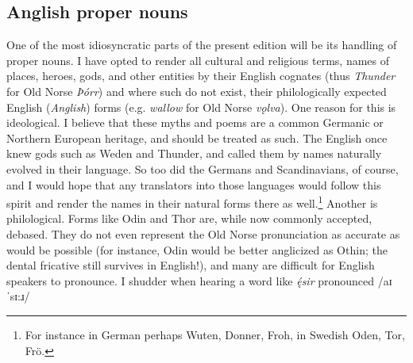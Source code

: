     \subsection{Anglish proper nouns}
      One of the most idiosyncratic parts of the present edition will be its handling of proper nouns. I have opted to render all cultural and religious terms, names of places, heroes, gods, and other entities by their English cognates (thus \emph{Thunder} for Old Norse \emph{Þórr}) and where such do not exist, their philologically expected English (\emph{Anglish}) forms (e.g. \emph{wallow} for Old Norse \emph{vǫlva}).
      One reason for this is ideological. I believe that these myths and poems are a common Germanic or Northern European heritage, and should be treated as such. The English once knew gods such as Weden and Thunder, and called them by names naturally evolved in their language. So too did the Germans and Scandinavians, of course, and I would hope that any translators into those languages would follow this spirit and render the names in their natural forms there as well.\footnote{For instance in German perhaps Wuten, Donner, Froh, in Swedish Oden, Tor, Frö.}
      Another is philological. Forms like Odin and Thor are, while now commonly accepted, debased. They do not even represent the Old Norse pronunciation as accurate as would be possible (for instance, Odin would be better anglicized as Othin; the dental fricative still survives in English!), and many are difficult for English speakers to pronounce. I shudder when hearing a word like \emph{ę́sir} pronounced /aɪˈsɪ:ɹ/

  \printbibliography%
